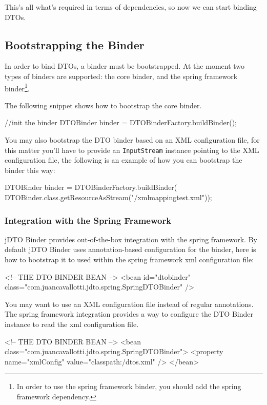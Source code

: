 \documentclass[11pt]{article}
\newcommand{\JDTO}{jDTO Binder\xspace}
\begin{document}
This's all what's required in terms of dependencies, so now we can start binding DTOs.

\subsection{Bootstrapping the Binder}


In order to bind DTOs, a binder must be bootstrapped. At the moment two types of binders
are supported: the core binder, and the spring framework binder\footnote{In order to use the spring framework binder, you should add the spring framework dependency.}.


The following snippet shows how to bootstrap the core binder.


\begin{java}
//init the binder
DTOBinder binder = DTOBinderFactory.buildBinder();
\end{java}

You may also bootstrap the DTO binder based on an XML configuration file, for this matter you'll have to provide an \texttt{InputStream} instance pointing to the XML configuration file, the following is an example of how you can bootstrap the binder this way:


\begin{java}
DTOBinder binder = DTOBinderFactory.buildBinder(
    DTOBinder.class.getResourceAsStream("/xmlmappingtest.xml"));
\end{java}

\subsubsection{Integration with the Spring Framework}

\JDTO provides out-of-the-box integration with the spring framework. By default \JDTO uses annotation-based configuration for the binder, here is how to bootstrap it to used within the spring framework xml configuration file:


\begin{xml}
<!-- THE DTO BINDER BEAN --> 
<bean id="dtobinder" 
    class="com.juancavallotti.jdto.spring.SpringDTOBinder" />
\end{xml}


You may want to use an XML configuration file instead of regular annotations. The spring framework integration
provides a way to configure the DTO Binder instance to read the xml configuration file.


\begin{xml}
<!-- THE DTO BINDER BEAN --> 
<bean class="com.juancavallotti.jdto.spring.SpringDTOBinder">
    <property name="xmlConfig" value="classpath:/dtos.xml" />
</bean>
\end{xml}
\end{document}
